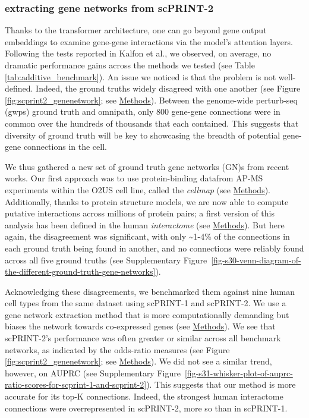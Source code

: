 \subsubsection{extracting gene networks from
\gls{scPRINT}-2}\label{extracting-gene-networks-from-scprint-2}

Thanks to the transformer architecture, one can go beyond gene output
embeddings to examine gene-gene interactions via the model's attention
layers. Following the tests reported in Kalfon et al., we observed, on
average, no dramatic performance gains across the methods we tested (see
Table \ref{tab:additive_benchmark}). An issue we noticed is that the problem is not well-defined.
Indeed, the ground truths widely disagreed with one another (see Figure
\ref{fig:scprint2_genenetwork}; see \hyperref[gene-network-task]{Methods}).
Between the genome-wide perturb-seq (\gls{gwps}) ground truth and omnipath,
only 800 gene-gene connections were in common over the hundreds of
thousands that each contained. This suggests that diversity of ground
truth will be key to showcasing the breadth of potential gene-gene
connections in the cell.

We thus gathered a new set of ground truth gene networks (\gls{GN})s from
recent works. Our first approach was to use protein-binding datafrom
\gls{AP-MS} experiments within the O2US cell line, called the
\emph{cellmap}\citep{schafferMultimodalCellMaps2025} (see
\hyperref[gene-network-task]{Methods}). Additionally, thanks to
protein structure models, we are now able to compute putative
interactions across millions of protein pairs; a first version of this
analysis has been defined in the human \emph{interactome} (see
\hyperref[gene-network-task]{Methods}). But here again, the
disagreement was significant, with only \textasciitilde1-4\% of the
connections in each ground truth being found in another, and no
connections were reliably found across all five ground truths (see Supplementary
Figure~\ref{fig-s30-venn-diagram-of-the-different-ground-truth-gene-networks}).

Acknowledging these disagreements, we benchmarked them against nine
human cell types from the same dataset using scPRINT-1 and \gls{scPRINT}-2. We
use a gene network extraction method that is more computationally
demanding but biases the network towards co-expressed genes (see
\hyperref[extracting-meta-cell-gene-networks-from-attention-matrices]{Methods}).
We see that \gls{scPRINT}-2's performance was often greater or similar across
all benchmark networks, as indicated by the odds-ratio measures (see
Figure \ref{fig:scprint2_genenetwork}; see \hyperref[gene-network-task]{Methods}).
We did not see a similar trend, however, on \gls{AUPRC} (see Supplementary Figure~\ref{fig-s31-whisker-plot-of-auprc-ratio-scores-for-scprint-1-and-scprint-2}). This suggests that our method is more accurate for its top-K
connections. Indeed, the strongest human interactome connections were
overrepresented in \gls{scPRINT}-2, more so than in \gls{scPRINT}-1.

